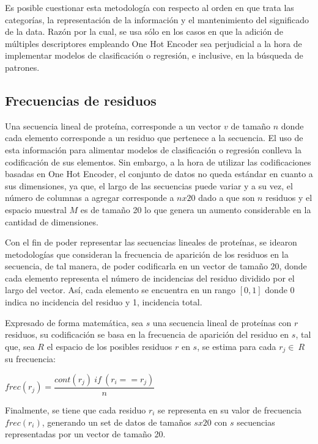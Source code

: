 Es posible cuestionar esta metodología con respecto al orden en que trata las categorías, la representación de la información y el mantenimiento del significado de la data. Razón por la cual, se usa sólo en los casos en que la adición de múltiples descriptores empleando One Hot Encoder sea perjudicial a la hora de implementar modelos de clasificación o regresión, e inclusive, en la búsqueda de patrones.

\subsection{Frecuencias de residuos}

Una secuencia lineal de proteína, corresponde a un vector $v$ de tamaño $n$ donde cada elemento corresponde a un residuo que pertenece a la secuencia. El uso de esta información para alimentar modelos de clasificación o regresión conlleva la codificación de sus elementos. Sin embargo, a la hora de utilizar las codificaciones basadas en One Hot Encoder, el conjunto de datos no queda estándar en cuanto a sus dimensiones, ya que, el largo de las secuencias puede variar y a su vez, el número de columnas a agregar corresponde a $nx20$ dado a que son $n$ residuos y el espacio muestral $M$ es de tamaño 20 lo que genera un aumento considerable en la cantidad de dimensiones.

Con el fin de poder representar las secuencias lineales de proteínas, se idearon metodologías que consideran la frecuencia de aparición de los residuos en la secuencia, de tal manera, de poder codificarla en un vector de tamaño 20, donde cada elemento representa el número de incidencias del residuo dividido por el largo del vector. Así, cada elemento se encuentra en un rango $[0,1]$ donde 0 indica no incidencia del residuo y 1, incidencia total.

Expresado de forma matemática, sea $s$ una secuencia lineal de proteínas con $r$ residuos, su codificación se basa en la frecuencia de aparición del residuo en $s$, tal que, sea $R$ el espacio de los posibles residuos $r$ en $s$, se estima para cada $r_{j} \in\ R$ su frecuencia:

\begin{center}
	$frec(r_{j}) = \dfrac{cont(r_{j})\ if\  (r_{i}==r_{j})}{n}$
\end{center}

Finalmente, se tiene que cada residuo $r_{i}$ se representa en su valor de frecuencia $frec(r_{i})$, generando un set de datos de tamaños $sx20$ con $s$ secuencias representadas por un vector de tamaño 20.

